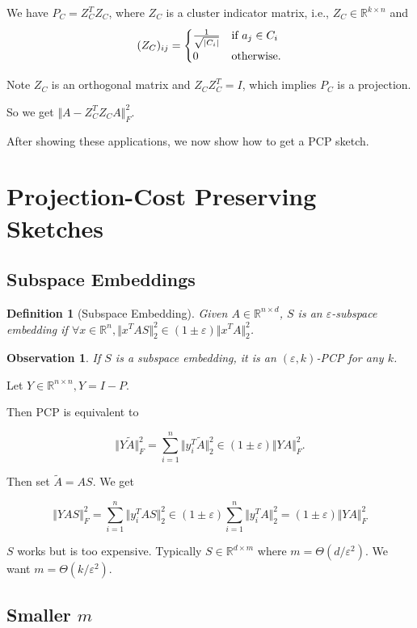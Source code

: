 \documentclass[11pt]{article}
\newcommand{\eps}{\varepsilon}
\newcommand{\R}{\mathbb{R}}
\newtheorem{observation}[theorem]{Observation}
\newtheorem{definition}[theorem]{Definition}
\begin{document}
We have $P_C = Z_C^T Z_C$, where $Z_C$ is a cluster indicator matrix, i.e., $Z_C \in \R^{k \times n}$ and
\[(Z_C)_{ij} = \begin{cases}
\frac{1}{\sqrt{|C_i|}} & \textnormal{if } a_j \in C_i \\
0 & \textnormal{otherwise}.
\end{cases}\]

Note $Z_C$ is an orthogonal matrix and $Z_C Z_C^T = I$, which implies $P_C$ is a projection.

So we get $\Vert A - Z_C^T Z_C A \Vert_F^2$.

After showing these applications, we now show how to get a PCP sketch.

\section{Projection-Cost Preserving Sketches}

\subsection{Subspace Embeddings}

\begin{definition}[Subspace Embedding]
Given $A \in \R^{n \times d}$, $S$ is an $\eps$-subspace embedding if $\forall x \in \R^n, \Vert x^T AS \Vert_2^2 \in (1 \pm \eps) \Vert x^T A \Vert_2^2$.
\end{definition}

\begin{observation}
If $S$ is a subspace embedding, it is an $(\eps,k)$-PCP for any $k$.
\end{observation}

Let $Y \in \R^{n \times n}, Y = I - P$.

Then PCP is equivalent to

\[
\Vert Y \tilde{A} \Vert_F^2 = \sum\limits_{i=1}^n \Vert y_i^T \tilde{A} \Vert_2^2 \in (1 \pm \eps) \Vert YA \Vert_F^2.
\]

Then set $\tilde{A} = AS$. We get

\[
\Vert Y A S \Vert_F^2 = \sum\limits_{i=1}^n \Vert y_i^T AS \Vert_2^2 \in (1 \pm \eps) \sum\limits_{i=1}^n \Vert y_i^T A \Vert_2^2 = (1 \pm \eps) \Vert YA \Vert_F^2
\]

$S$ works but is too expensive. Typically $S \in \R^{d \times m}$ where $m = \Theta(d/\eps^2)$. We want $m = \Theta(k/\eps^2)$.

\subsection{Smaller $m$}
\end{document}
